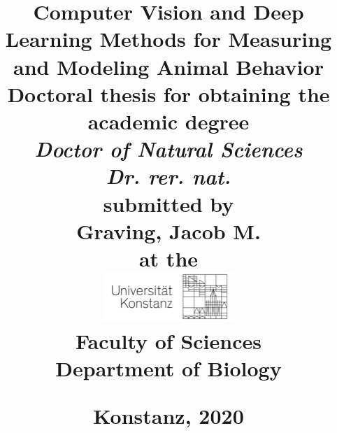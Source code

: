 \documentclass[7pt,a4paper,oneside,fullpage]{report} %
\title{
	\HUGE \textbf{Computer Vision and Deep Learning Methods for Measuring and Modeling Animal Behavior} \\
	\vspace{2.5cm}
	\Large \textbf{Doctoral thesis for obtaining the} \\
	\Large \textbf{academic degree} \\
	\vspace{1cm}
	\Large \textit{Doctor of Natural Sciences} \\
	\Large \textit{Dr. rer. nat.} \\
	\vspace{2cm}
    \large submitted by \\
    \vspace{0.5cm}
    \Large Graving, Jacob M. \\
    \vspace{1cm}
    \large at the \\
    \vspace{1cm}
	\includegraphics[width=5cm]{graphics/uni_logo.png}\\
	\vspace{2cm}
	\Large Faculty of Sciences \\
	\vspace{0.5cm}
	\Large Department of Biology \\
	\vspace{2cm}
	\date{}
	\begin{flushleft}
	    \large Konstanz, 2020
	\end{flushleft}
	\clearpage
	}
\def\blankpage{%
      \clearpage%
      \thispagestyle{empty}%
      \addtocounter{page}{-1}%
      \null%
      \clearpage}
\begin{document}
\maketitle
{} %
\setcounter{page}{1}
\tableofcontents

\begin{doublespace}
    
	\newpage
    
    \newpage 
    
    \newpage 
    
    \newpage 
    
    \begin{appendices}
        
        \newpage
        
    \end{appendices}
\end{doublespace} %

\nocite{*} %

\renewcommand{\bibname}{References}


\begin{doublespace}
    
    
\end{doublespace}
\end{document}
